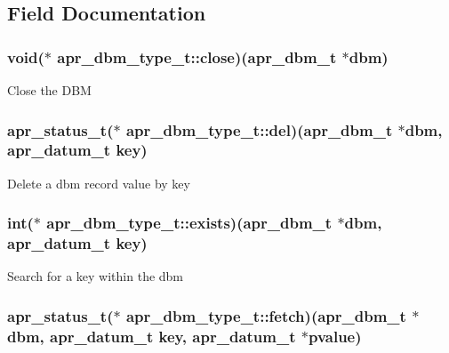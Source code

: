 \subsection{Field Documentation}
\hypertarget{structapr__dbm__type__t_a21e4c81ee578b14ef5503c5ac7ee9312}{
\subsubsection[{close}]{\setlength{\rightskip}{0pt plus 5cm}void($\ast$ apr\-\_\-dbm\-\_\-type\-\_\-t\-::close)({\bf apr\-\_\-dbm\-\_\-t} $\ast$dbm)}}\label{structapr__dbm__type__t_a21e4c81ee578b14ef5503c5ac7ee9312}
Close the D\-B\-M \hypertarget{structapr__dbm__type__t_a06d2f0a91b5ea931996acf364f392073}{
\subsubsection[{del}]{\setlength{\rightskip}{0pt plus 5cm}apr\-\_\-status\-\_\-t($\ast$ apr\-\_\-dbm\-\_\-type\-\_\-t\-::del)({\bf apr\-\_\-dbm\-\_\-t} $\ast$dbm, {\bf apr\-\_\-datum\-\_\-t} key)}}\label{structapr__dbm__type__t_a06d2f0a91b5ea931996acf364f392073}
Delete a dbm record value by key \hypertarget{structapr__dbm__type__t_ae671f4abb2d4f2ff42b6368f057c2166}{
\subsubsection[{exists}]{\setlength{\rightskip}{0pt plus 5cm}int($\ast$ apr\-\_\-dbm\-\_\-type\-\_\-t\-::exists)({\bf apr\-\_\-dbm\-\_\-t} $\ast$dbm, {\bf apr\-\_\-datum\-\_\-t} key)}}\label{structapr__dbm__type__t_ae671f4abb2d4f2ff42b6368f057c2166}
Search for a key within the dbm \hypertarget{structapr__dbm__type__t_a17d44119b2ba7594a9a6593b82bc8d5f}{
\subsubsection[{fetch}]{\setlength{\rightskip}{0pt plus 5cm}apr\-\_\-status\-\_\-t($\ast$ apr\-\_\-dbm\-\_\-type\-\_\-t\-::fetch)({\bf apr\-\_\-dbm\-\_\-t} $\ast$dbm, {\bf apr\-\_\-datum\-\_\-t} key, {\bf apr\-\_\-datum\-\_\-t} $\ast$pvalue)}}\label{structapr__dbm__type__t_a17d44119b2ba7594a9a6593b82bc8d5f}

